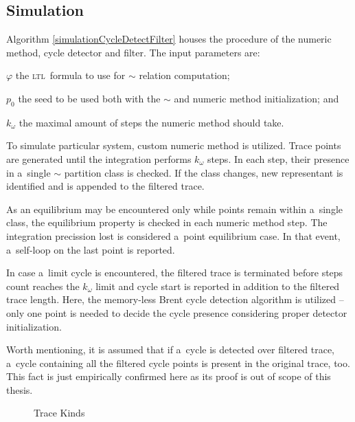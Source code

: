 \documentclass[12pt,oneside,draft]{fithesis}
\newcommand{\ltl}{\textsc{ltl}~}
\begin{document}
\subsection*{Simulation}
Algorithm \ref{simulationCycleDetectFilter} houses the procedure of
the numeric method, cycle detector and filter. The input parameters are:
\begin{inparaenum}
	\item{$\varphi$} the \ltl formula to use for $\sim$ relation
		computation;
	\item{$p_0$} the seed to be used both with the $\sim$ and numeric
		method initialization; and
	\item{$k_{\omega}$} the maximal amount of steps the numeric method
		should take.
\end{inparaenum}

To simulate particular system, custom numeric method is utilized.
Trace points are generated until the integration performs $k_{\omega}$
steps. In each step, their presence in a~single $\sim$ partition class
is checked. If the class changes, new representant is identified
and is appended to the filtered trace.

As an equilibrium may be encountered only while points remain within
a~single class, the equilibrium property is checked in each numeric
method step. The integration precission lost is considered a~point
equilibrium case. In that event, a~self-loop on the last point is
reported.

In case a~limit cycle is encountered, the filtered trace is terminated
before steps count reaches the $k_{\omega}$ limit and cycle start is
reported in addition to the filtered trace length. Here, the memory-less
Brent cycle detection algorithm is utilized\cite{wloop,brent}
-- only one point is needed to decide the cycle presence considering
proper detector initialization.

Worth mentioning, it is assumed that if a~cycle is detected over
filtered trace, a~cycle containing all the filtered cycle points is
present in the original trace, too. This fact is just empirically
confirmed here as its proof is out of scope of this thesis.

\begin{figure}
\label{fig:trace:kinds}
\caption{Trace Kinds}
\end{figure}
\end{document}
